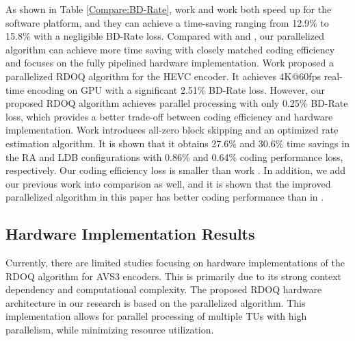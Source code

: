 \documentclass[lettersize,journal]{IEEEtran}
\begin{document}
As shown in Table \ref{Compare:BD-Rate}, work \cite{lee2015fastquantizationmethod} and work \cite{xu2020simplifiedLevelEstimation} both speed up for the software platform, and they can achieve a time-saving ranging from 12.9\% to 15.8\% with a negligible BD-Rate loss. Compared with \cite{lee2015fastquantizationmethod} and \cite{xu2020simplifiedLevelEstimation}, our parallelized algorithm can achieve more time saving with closely matched coding efficiency and focuses on the fully pipelined hardware implementation. Work \cite{igarashi2018parallelGPU} proposed a parallelized RDOQ algorithm for the HEVC encoder. It achieves 4K@60fps real-time encoding on GPU with a significant 2.51\% BD-Rate loss. However, our proposed RDOQ algorithm achieves parallel processing with only 0.25\% BD-Rate loss, which provides a better trade-off between coding efficiency and hardware implementation. Work \cite{xu2022hardwarefriendlyforrdoq} introduces all-zero block skipping and an optimized rate estimation algorithm. It is shown that it obtains 27.6\% and 30.6\% time savings in the RA and LDB configurations with 0.86\% and 0.64\% coding performance loss, respectively. Our coding efficiency loss is smaller than work \cite{xu2022hardwarefriendlyforrdoq}. In addition, we add our previous work \cite{zhao2023scanline} into comparison as well, and it is shown that the improved parallelized algorithm in this paper has better coding performance than in \cite{zhao2023scanline}. 

\subsection{Hardware Implementation Results}
Currently, there are limited studies focusing on hardware implementations of the RDOQ algorithm for AVS3 encoders. This is primarily due to its strong context dependency and computational complexity. The proposed RDOQ hardware architecture in our research is based on the parallelized algorithm. This implementation allows for parallel processing of multiple TUs with high parallelism, while minimizing resource utilization. 
\end{document}
